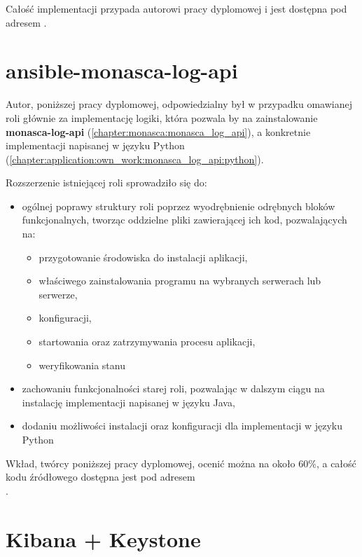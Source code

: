 Całość implementacji przypada autorowi pracy dyplomowej i jest dostępna pod adresem
.

\section{ansible-monasca-log-api}
\label{chapter:application:own_work:ansible_monasca_log_api}

    Autor, poniższej pracy dyplomowej, odpowiedzialny był w przypadku omawianej roli głównie za implementację
    logiki, która pozwala by na zainstalowanie \textbf{monasca-log-api} (\ref{chapter:monasca:monasca_log_api}),
    a konkretnie implementacji napisanej w języku Python (\ref{chapter:application:own_work:monasca_log_api:python}).
    
    Rozszerzenie istniejącej roli sprowadziło się do:
    \begin{itemize}
        \item ogólnej poprawy struktury roli poprzez wyodrębnienie odrębnych bloków funkcjonalnych, tworząc
        oddzielne pliki zawierającej ich kod, pozwalających na:
        \begin{itemize}
            \item przygotowanie środowiska do instalacji aplikacji,
            \item właściwego zainstalowania programu na wybranych serwerach lub serwerze,
            \item konfiguracji,
            \item startowania oraz zatrzymywania procesu aplikacji,
            \item weryfikowania stanu
        \end{itemize}
        \item zachowaniu funkcjonalności starej roli, pozwalając w dalszym ciągu na instalację implementacji
        napisanej w języku Java,
        \item dodaniu możliwości instalacji oraz konfiguracji dla implementacji w języku Python
    \end{itemize}
    
    Wkład, twórcy poniższej pracy dyplomowej, ocenić można na około 60\%, a całość kodu źródłowego
    dostępna jest pod adresem \\ .

\section{Kibana + Keystone}
\label{chapter:application:own_work:kibana_and_keystone}


